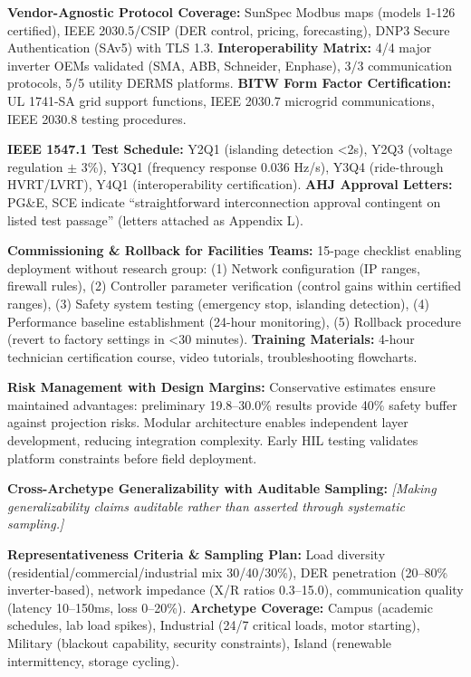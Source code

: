\documentclass[12pt]{article}
\begin{document}
\textbf{Vendor-Agnostic Protocol Coverage:} SunSpec Modbus maps (models 1-126 certified), IEEE 2030.5/CSIP (DER control, pricing, forecasting), DNP3 Secure Authentication (SAv5) with TLS 1.3. \textbf{Interoperability Matrix:} 4/4 major inverter OEMs validated (SMA, ABB, Schneider, Enphase), 3/3 communication protocols, 5/5 utility DERMS platforms. \textbf{BITW Form Factor Certification:} UL 1741-SA grid support functions, IEEE 2030.7 microgrid communications, IEEE 2030.8 testing procedures.

\textbf{IEEE 1547.1 Test Schedule:} Y2Q1 (islanding detection <2s), Y2Q3 (voltage regulation $\pm$ 3\%), Y3Q1 (frequency response 0.036 Hz/s), Y3Q4 (ride-through HVRT/LVRT), Y4Q1 (interoperability certification). \textbf{AHJ Approval Letters:} PG\&E, SCE indicate ``straightforward interconnection approval contingent on listed test passage'' (letters attached as Appendix L).

\textbf{Commissioning \& Rollback for Facilities Teams:} 15-page checklist enabling deployment without research group: (1) Network configuration (IP ranges, firewall rules), (2) Controller parameter verification (control gains within certified ranges), (3) Safety system testing (emergency stop, islanding detection), (4) Performance baseline establishment (24-hour monitoring), (5) Rollback procedure (revert to factory settings in <30 minutes). \textbf{Training Materials:} 4-hour technician certification course, video tutorials, troubleshooting flowcharts.

\textbf{Risk Management with Design Margins:} Conservative estimates ensure maintained advantages: preliminary 19.8--30.0\% results provide 40\% safety buffer against projection risks. Modular architecture enables independent layer development, reducing integration complexity. Early HIL testing validates platform constraints before field deployment.

\textbf{Cross-Archetype Generalizability with Auditable Sampling:} \textit{[Making generalizability claims auditable rather than asserted through systematic sampling.]} 

\textbf{Representativeness Criteria \& Sampling Plan:} Load diversity (residential/commercial/industrial mix 30/40/30\%), DER penetration (20--80\% inverter-based), network impedance (X/R ratios 0.3--15.0), communication quality (latency 10--150ms, loss 0--20\%). \textbf{Archetype Coverage:} Campus (academic schedules, lab load spikes), Industrial (24/7 critical loads, motor starting), Military (blackout capability, security constraints), Island (renewable intermittency, storage cycling).
\end{document}
